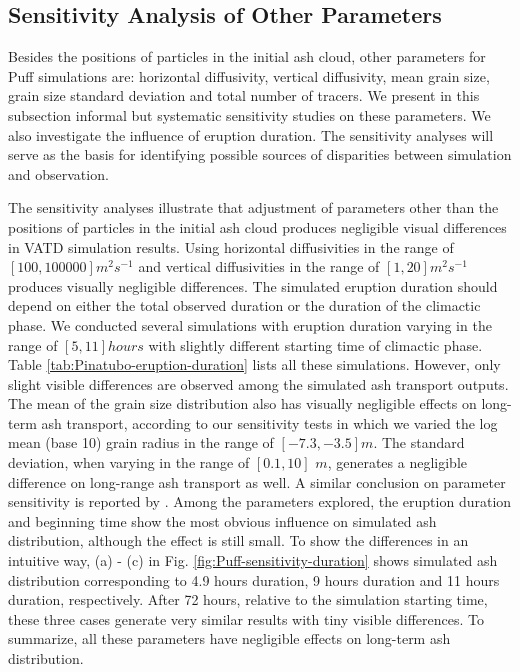 \documentclass[utf8]{frontiersSCNS} %
\begin{document}
\subsection{Sensitivity Analysis of Other Parameters}

Besides the positions of particles in the initial ash cloud, other parameters for Puff simulations are: horizontal diffusivity, vertical diffusivity, mean grain size, grain size standard deviation and total number of tracers. We present in this subsection informal but systematic sensitivity studies on these parameters. We also investigate the influence of eruption duration. The sensitivity analyses will serve as the basis for identifying possible sources of disparities between simulation and observation.

The sensitivity analyses illustrate that adjustment of parameters other than the positions of particles in the initial ash cloud produces negligible visual differences in VATD simulation results. Using horizontal diffusivities in the range of $[100, 100000] m^2s^{-1} $ and vertical diffusivities in the range of $[1, 20] m^2s^{-1}$ produces visually negligible differences. The simulated eruption duration should depend on either the total observed duration or the duration of the climactic phase. We conducted several simulations with eruption duration varying in the range of $[5, 11] hours$ with slightly different starting time of climactic phase. Table \ref{tab:Pinatubo-eruption-duration} lists all these simulations. However, only slight visible differences are observed among the simulated ash transport outputs. The mean of the grain size distribution also has visually negligible effects on long-term ash transport, according to our sensitivity tests in which we varied the log mean (base 10) grain radius in the range of $[-7.3, -3.5] m$. The standard deviation, when varying in the range of $[0.1, 10]$ $m$, generates a negligible difference on long-range ash transport as well. A similar conclusion on parameter sensitivity is reported by \citet[e.g.][]{fero2008simulation, daniele2009applications}. Among the parameters explored, the eruption duration and beginning time show the most obvious influence on simulated ash distribution, although the effect is still small. To show the differences in an intuitive way, 
(a) - (c) in Fig. \ref{fig:Puff-sensitivity-duration} shows simulated ash distribution corresponding to 4.9 hours duration, 9 hours duration and 11 hours duration, respectively. After 72 hours, relative to the simulation starting time, these three cases generate very similar results with tiny visible differences. To summarize, all these parameters have negligible effects on long-term ash distribution.
\end{document}
